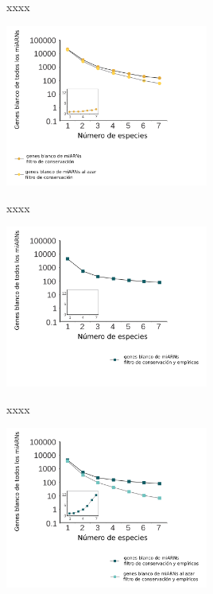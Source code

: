 \documentclass{beamer}
\begin{document}
\begin{frame}{xxxx}
	\begin{center}
		\includegraphics[width=0.5\textwidth]{img/NAR_fig2_02.png}
	\end{center}
\end{frame}

\begin{frame}{xxxx}
	\begin{center}
		\includegraphics[width=0.5\textwidth]{img/NAR_fig2_03.png}
	\end{center}
\end{frame}

\begin{frame}{xxxx}
	\begin{center}
		\includegraphics[width=0.5\textwidth]{img/NAR_fig2_04.png}
	\end{center}
\end{frame}
\end{document}
